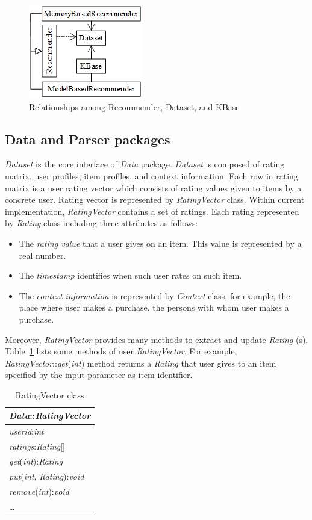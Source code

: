 \documentclass[a4paper,twoside]{article}
\begin{document}
\begin{figure}
\centering
\includegraphics{RecommenderDatasetKBase.png}
\caption{Relationships among Recommender, Dataset, and KBase}
\label{figure:recommender-dataset-kbase}
\end{figure}

\subsection{Data and Parser packages}
\label{subsec:data-parser-packages}
\textit{Dataset} is the core interface of \textit{Data} package. \textit{Dataset} is composed of rating matrix, user profiles, item profiles, and context information. Each row in rating matrix is a user rating vector which consists of rating values given to items by a concrete user. Rating vector is represented by \textit{RatingVector} class. Within current implementation, \textit{RatingVector} contains a set of ratings. Each rating represented by \textit{Rating} class including three attributes as follows:
\begin{itemize}
\item The \textit{rating value} that a user gives on an item. This value is represented by a real number.
\item The \textit{timestamp} identifies when such user rates on such item.
\item The \textit{context information} is represented by \textit{Context} class, for example, the place where user makes a purchase, the persons with whom user makes a purchase.
\end{itemize}
Moreover, \textit{RatingVector} provides many methods to extract and update \textit{Rating} (s). Table~\ref{table:ratingvector} lists some methods of user \textit{RatingVector}. For example, \textit{RatingVector}::\textit{get}(\textit{int}) method returns a \textit{Rating} that user gives to an item specified by the input parameter as item identifier.
\begin{table}
\centering
\caption{RatingVector class}
\label{table:ratingvector}
\begin{tabular}{|l|} \hline
\textit{Data}::\textit{RatingVector} \\ \hline
\textit{userid}:\textit{int} \\
\textit{ratings}:\textit{Rating}[] \\ \hline
\textit{get}(\textit{int}):\textit{Rating} \\
\textit{put}(\textit{int}, \textit{Rating}):\textit{void} \\
\textit{remove}(\textit{int}):\textit{void} \\
\ldots \\ \hline
\end{tabular}
\end{table}
\end{document}
